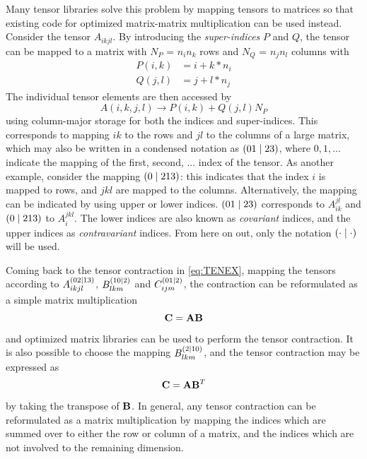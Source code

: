 Many tensor libraries solve this problem by mapping tensors to matrices so that existing code for optimized matrix-matrix multiplication can be used instead. Consider the tensor $A_{ikjl}$. By introducing the \emph{super-indices} $P$ and $Q$, the tensor can be mapped to a matrix with $N_P$ = $n_i n_k$ rows and $N_Q$ = $n_j n_l$ columns with
\begin{align}
P(i,k) &= i + k*n_i \\
Q(j,l) &= j + l*n_j
\end{align}
\noindent The individual tensor elements are then accessed by
\begin{equation}
A(i,k,j,l) \rightarrow P(i,k) + Q(j,l) N_P
\end{equation}
\noindent using column-major storage for both the indices and super-indices. This corresponds to mapping $ik$ to the rows and $jl$ to the columns of a large matrix, which may also be written in a condensed notation as $\left( 01 \mid 23 \right)$, where $0,1,...$ indicate the mapping of the first, second, ... index of the tensor. As another example, consider the mapping $\left( 0 \mid 213 \right)$: this indicates that the index $i$ is mapped to rows, and $jkl$ are mapped to the columns. Alternatively, the mapping can be indicated by using upper or lower indices. $\left( 01 \mid 23 \right)$ corresponds to $A_{ik}^{jl}$ and $\left( 0 \mid 213 \right)$ to $A_{i}^{jkl}$. The lower indices are also known as \emph{covariant} indices, and the upper indices as \emph{contravariant} indices. From here on out, only the notation $\left( \cdot \mid \cdot \right)$ will be used.

Coming back to the tensor contraction in \ref{eq:TENEX}, mapping the tensors according to $A_{ikjl}^{\left( 02 \mid 13 \right)}$, $B_{lkm}^{\left( 10 \mid 2 \right)}$ and $C_{ijm}^{\left( 01 \mid 2 \right)}$, the contraction can be reformulated as a simple matrix multiplication
\begin{equation}
\mathbf{C} = \mathbf{A} \mathbf{B}
\end{equation}
\noindent and optimized matrix libraries can be used to perform the tensor contraction. It is also possible to choose the mapping $B_{lkm}^{\left( 2 \mid 10 \right)}$, and the tensor contraction may be expressed as
\begin{equation}
\mathbf{C} = \mathbf{A} \mathbf{B}^T
\end{equation}
\noindent by taking the transpose of $\mathbf{B}$. In general, any tensor contraction can be reformulated as a matrix multiplication by mapping the indices which are summed over to either the row or column of a matrix, and the indices which are not involved to the remaining dimension. 

